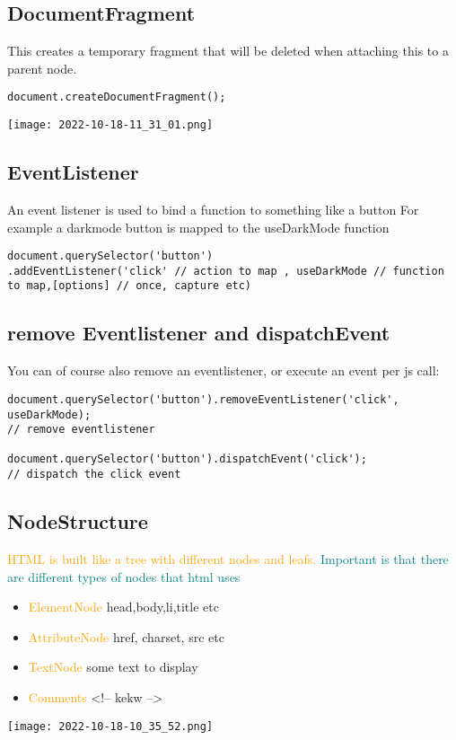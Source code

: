 \documentclass[main.tex,fontsize=6pt,paper=a4,paper=landscape,DIV=calc,]{scrartcl}
\begin{document}
\begin{multicols*}{4}
\subsection{DocumentFragment}  
This creates a temporary fragment that will be deleted when attaching this to a parent node.
\vspace{-2mm}
\begin{lstlisting}
document.createDocumentFragment();
\end{lstlisting}
\vspace{2mm}
\texttt{[image: 2022-10-18-11\_31\_01.png]}

\subsection{EventListener}  
An event listener is used to bind a function to something like a button\newline
For example a darkmode button is mapped to the useDarkMode function
\vspace{-2mm}
\begin{lstlisting}
document.querySelector('button')
.addEventListener('click' // action to map , useDarkMode // function to map,[options] // once, capture etc)
\end{lstlisting}
\vspace{2mm}


\subsection{remove Eventlistener and dispatchEvent}  
You can of course also remove an eventlistener, or execute an event per js call:
\vspace{-2mm}
\begin{lstlisting}
document.querySelector('button').removeEventListener('click', useDarkMode);
// remove eventlistener

document.querySelector('button').dispatchEvent('click');
// dispatch the click event
\end{lstlisting}
\vspace{2mm}

\subsection{NodeStructure}  
\textcolor{orange}{HTML is built like a tree with different nodes and leafs.}\newline
\textcolor{teal}{Important is that there are different types of nodes that html uses}
\begin{itemize}
  \item \textcolor{orange}{ElementNode} head,body,li,title etc
  \item \textcolor{orange}{AttributeNode} href, charset, src etc
  \item \textcolor{orange}{TextNode} some text to display
  \item \textcolor{orange}{Comments} <!-- kekw -->
\end{itemize}
\texttt{[image: 2022-10-18-10\_35\_52.png]}


\end{multicols*}
\end{document}
